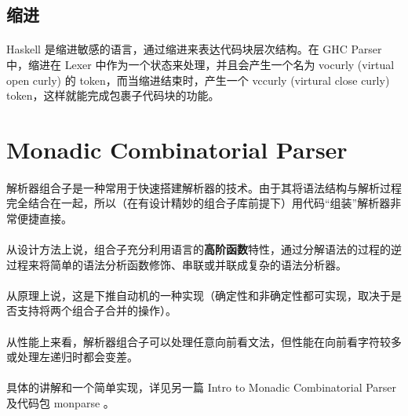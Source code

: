\documentclass{article}
\begin{document}
	\subsection{缩进}
	\paragraph{}
	Haskell 是缩进敏感的语言，通过缩进来表达代码块层次结构。在 GHC Parser 中，缩进在 Lexer 中作为一个状态来处理，并且会产生一个名为 vocurly (virtual open curly) 的 token，而当缩进结束时，产生一个 vccurly (virtural close curly) token，这样就能完成包裹子代码块的功能。
	
	\section{ Monadic Combinatorial Parser }
	\paragraph{}
	解析器组合子\cite{Hutton96monadicparser}是一种常用于快速搭建解析器的技术。由于其将语法结构与解析过程完全结合在一起，所以（在有设计精妙的组合子库\cite{parsec}前提下）用代码“组装”解析器非常便捷直接。
	\paragraph{}
	从设计方法上说，组合子充分利用语言的\textbf{高阶函数}特性，通过分解语法的过程的逆过程来将简单的语法分析函数修饰、串联或并联成复杂的语法分析器。
	\paragraph{}
	从原理上说，这是下推自动机的一种实现（确定性和非确定性都可实现，取决于是否支持将两个组合子合并的操作）。
	\paragraph{}
	从性能上来看，解析器组合子可以处理任意向前看文法，但性能在向前看字符较多或处理左递归时都会变差\cite{Frost07parsercombinators}。
	\paragraph{}
	具体的讲解和一个简单实现，详见另一篇 Intro to Monadic Combinatorial Parser 及代码包 monparse 。
 	
 	\medskip
	
	
\end{document}
